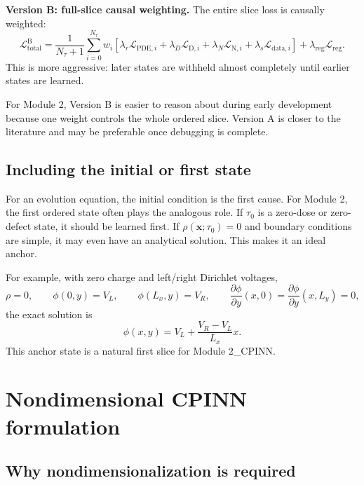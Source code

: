 \documentclass[11pt]{article}
\newcommand{\xv}{\bm{x}}
\newcommand{\Lreg}{\mathcal{L}_{\mathrm{reg}}}
\newcommand{\Ltot}{\mathcal{L}_{\mathrm{total}}}
\newcommand{\taud}{\tau}
\begin{document}
\textbf{Version B: full-slice causal weighting.} The entire slice loss is causally weighted:
\begin{equation}
\Ltot^{\mathrm{B}}=
\frac{1}{N_\taud+1}\sum_{i=0}^{N_\taud}w_i
\left[\lambda_r\mathcal{L}_{\mathrm{PDE},i}+\lambda_D\mathcal{L}_{\mathrm{D},i}+\lambda_N\mathcal{L}_{\mathrm{N},i}+\lambda_s\mathcal{L}_{\mathrm{data},i}\right]
+\lambda_{\mathrm{reg}}\Lreg.
\label{eq:full_slice_weighting}
\end{equation}
This is more aggressive: later states are withheld almost completely until earlier states are learned.

For Module 2, Version B is easier to reason about during early development because one weight controls the whole ordered slice. Version A is closer to the literature and may be preferable once debugging is complete.

\subsection{Including the initial or first state}

For an evolution equation, the initial condition is the first cause. For Module 2, the first ordered state often plays the analogous role. If $\taud_0$ is a zero-dose or zero-defect state, it should be learned first. If $\rho(\xv;\taud_0)=0$ and boundary conditions are simple, it may even have an analytical solution. This makes it an ideal anchor.

For example, with zero charge and left/right Dirichlet voltages,
\begin{equation}
\rho=0,
\qquad
\phi(0,y)=V_L,
\qquad
\phi(L_x,y)=V_R,
\qquad
\frac{\partial\phi}{\partial y}(x,0)=\frac{\partial\phi}{\partial y}(x,L_y)=0,
\end{equation}
the exact solution is
\begin{equation}
\phi(x,y)=V_L+\frac{V_R-V_L}{L_x}x.
\label{eq:linear_potential_anchor}
\end{equation}
This anchor state is a natural first slice for Module 2\_CPINN.

\section{Nondimensional CPINN formulation}

\subsection{Why nondimensionalization is required}
\end{document}
